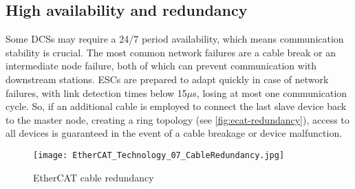 \subsection{High availability and redundancy}

Some DCSs may require a 24/7 period availability, which means communication stability is crucial.
The most common network failures are a cable break or an intermediate node failure, both of which can prevent communication with downstream stations.
ESCs are prepared to adapt quickly in case of network failures, with link detection times below 15$\mu$s, losing at most one communication cycle.
So, if an additional cable is employed to connect the last slave device back to the master node, creating a ring topology (see \autoref{fig:ecat-redundancy}), access to all devices is guaranteed in the event of a cable breakage or device malfunction.

\begin{figure}[htp]
	\centering
	\texttt{[image: EtherCAT\_Technology\_07\_CableRedundancy.jpg]}
	\caption{EtherCAT cable redundancy \cite{protocol:ethercat}}
	\label{fig:ecat-redundancy}
\end{figure}


